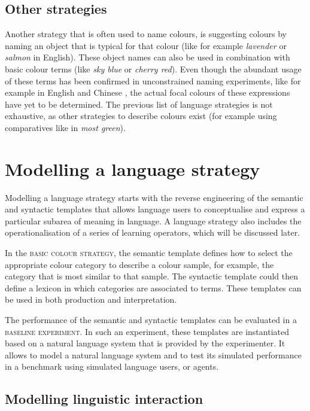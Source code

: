 \subsection{Other strategies}

Another strategy that is often used to name colours, is suggesting
colours by naming an object that is typical for that colour (like for
example \textit{lavender} or \textit{salmon} in English). These object names can
also be used in combination with basic colour terms (like \textit{sky blue}
or \textit{cherry red}). Even though the abundant usage of these terms has
been confirmed in unconstrained naming experiments, like for example
in English and Chinese \citep{lin01unconstrained}, the actual focal
colours of these expressions have yet to be determined. The previous
list of language strategies is not exhaustive, as other strategies to
describe colours exist (for example using comparatives like in \textit{most green}).

\section{Modelling a language strategy}

Modelling a language strategy starts with the reverse engineering of
the semantic and syntactic templates that allows language users to
conceptualise and express a particular subarea of meaning in
language. A language strategy also includes the operationalisation of
a series of learning operators, which will be discussed later.

In the \textsc{basic colour strategy}, the semantic template defines how
to select the appropriate colour category to describe a colour sample,
for example, the category that is most similar to that sample. The
syntactic template could then define a lexicon in which categories are
associated to terms. These templates can be used in both production
and interpretation.

The performance of the semantic and syntactic templates can be
evaluated in a \textsc{baseline experiment}. 
In such an experiment, these templates are instantiated
based on a natural language system that is provided by the
experimenter. It allows to model a natural language system and to test
its simulated performance in a benchmark using simulated language
users, or agents.

\subsection{Modelling linguistic interaction}
\label{s:intro-language-games}

